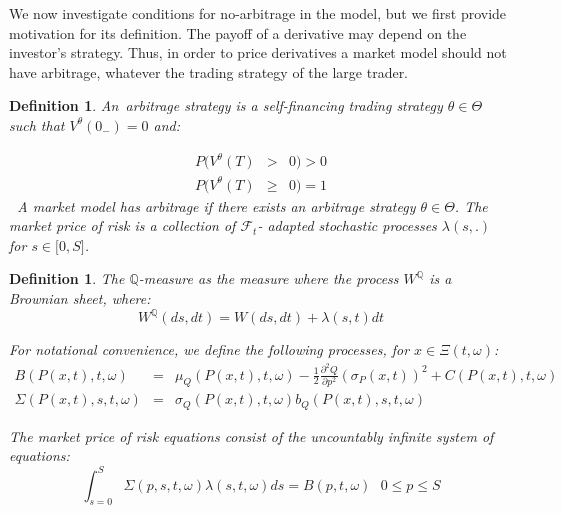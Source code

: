 \documentclass{article}
\newtheorem{definition}[theorem]{Definition}
\begin{document}
We now investigate conditions for no-arbitrage in the model, but we first
provide motivation for its definition. The payoff of a derivative may depend
on the investor's strategy. Thus, in order to price derivatives a market
model should not have arbitrage, whatever the trading strategy of the large
trader.

\bigskip

\begin{definition}
An\textit{\ arbitrage strategy} is a self-financing
trading strategy $\theta \in \Theta $ such that $V^{\theta }(0_{-})=0$ and:

\begin{eqnarray*}
P(V^{\theta }(T) &>&0)>0 \\
P(V^{\theta }(T) &\geq &0)=1
\end{eqnarray*}%
\bigskip \textbf{\ }A \textit{market model has arbitrage} if there exists an
arbitrage strategy $\theta \in \Theta $. The \textit{market price of risk}
is a collection of $\mathcal{F}_{t}$- adapted stochastic processes $\lambda
(s,.)$ for $s\in \lbrack 0,S]$.
\end{definition}


\begin{definition}
The $\mathbb{Q}$-measure as the measure where the
process $W^{\mathbb{Q}}$ is a Brownian sheet, where:%
\begin{equation}
W^{\mathbb{Q}}(ds,dt)=W(ds,dt)+\lambda (s,t)dt  \label{WQ}
\end{equation}

For notational convenience, we define the following processes, for $x\in \Xi
(t,\omega )$:%
\begin{eqnarray*}
B(P(x,t),t,\omega ) &=&\mu _{Q}(P(x,t),t,\omega )-\frac{1}{2}\frac{\partial
^{2}Q}{\partial p^{2}}(\sigma _{P}(x,t))^{2}+C(P(x,t),t,\omega ) \\
\Sigma (P(x,t),s,t,\omega ) &=&\sigma _{Q}(P(x,t),t,\omega
)b_{Q}(P(x,t),s,t,\omega )
\end{eqnarray*}

The \textit{market price of risk equations} consist of the uncountably
infinite system of equations:
\begin{equation}
\int_{s=0}^{S}\Sigma (p,s,t,\omega )\lambda (s,t,\omega )ds=B(p,t,\omega )%
\text{ \ \ \ \ \ }0\leq p\leq S  \label{MPR}
\end{equation}
\end{definition}
\end{document}
